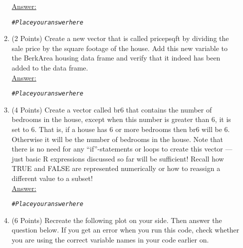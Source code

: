 \documentclass[12pt,letterpaper,final]{article}\usepackage[]{graphicx}\usepackage[]{xcolor}
\makeatletter
\newcommand{\hlcom}[1]{\textcolor[rgb]{0.678,0.584,0.686}{\textit{#1}}}%
\newenvironment{kframe}{%
 \def\at@end@of@kframe{}%
 \ifinner\ifhmode%
  \def\at@end@of@kframe{\end{minipage}}%
  \begin{minipage}{\columnwidth}%
 \fi\fi%
 \def\FrameCommand##1{\hskip\@totalleftmargin \hskip-\fboxsep
 \colorbox{shadecolor}{##1}\hskip-\fboxsep
     \hskip-\linewidth \hskip-\@totalleftmargin \hskip\columnwidth}%
 \MakeFramed {\advance\hsize-\width
   \@totalleftmargin\z@ \linewidth\hsize
   \@setminipage}}%
 {\par\unskip\endMakeFramed%
 \at@end@of@kframe}
\newenvironment{knitrout}{}{} %
\makeatother
\begin{document}
\begin{enumerate}
\begin{enumerate}
\underline{Answer:}
\begin{knitrout}
\color{fgcolor}\begin{kframe}
\begin{alltt}
\hlcom{# Place your answer here}
\end{alltt}
\end{kframe}
\end{knitrout}


\item (2 Points)
Create a new vector that is called pricepsqft by dividing the sale price by the square footage
of the house.  Add this new variable to the BerkArea housing data frame
and verify that it indeed has been added to the data frame. \\

\underline{Answer:}
\begin{knitrout}
\color{fgcolor}\begin{kframe}
\begin{alltt}
\hlcom{# Place your answer here}
\end{alltt}
\end{kframe}
\end{knitrout}


\item (4 Points)
Create a vector called br6 that contains the number of bedrooms in the house, except
when this number is greater than 6, it is set to 6.  That is, if a house has 6 or more
bedrooms then br6 will be 6. Otherwise it will be the number of bedrooms in the house.
Note that there is no need for any ``if''-statements or loops to create this vector ---
just basic R expressions discussed so far will be sufficient! Recall how 
TRUE and FALSE are represented numerically or how to reassign a different value to a subset! \\

\underline{Answer:}
\begin{knitrout}
\color{fgcolor}\begin{kframe}
\begin{alltt}
\hlcom{# Place your answer here}
\end{alltt}
\end{kframe}
\end{knitrout}


\item (6 Points)
Recreate the following plot on your side. Then answer the question below.
If you get an error when you run this code, check whether you are using
the correct variable names in your code earlier on.


\end{enumerate}
\end{enumerate}
\end{document}
